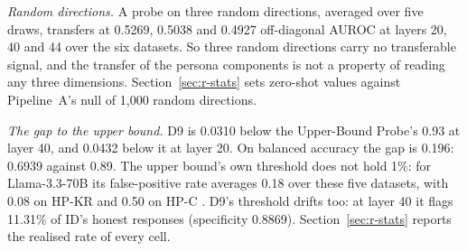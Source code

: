 \emph{Random directions.} A probe on three random directions, averaged over five draws, transfers at 0.5269, 0.5038 and 0.4927 off-diagonal AUROC at layers 20, 40 and 44 over the six datasets. %
So three random directions carry no transferable signal, and the transfer of the persona components is not a property of reading any three dimensions. %
Section~\ref{sec:r-stats} sets zero-shot values against Pipeline~A's null of 1{,}000 random directions. %

\emph{The gap to the upper bound.} D9 is 0.0310 below the Upper-Bound Probe's 0.93 at layer 40, and 0.0432 below it at layer 20. %
On balanced accuracy the gap is 0.196: 0.6939 against 0.89. %
The upper bound's own threshold does not hold 1\%: for Llama-3.3-70B its false-positive rate averages 0.18 over these five datasets, with 0.08 on HP-KR and 0.50 on HP-C \parencite[p.~56]{kretschmar2025liars}. %
D9's threshold drifts too: at layer 40 it flags 11.31\% of ID's honest responses (specificity 0.8869). %
Section~\ref{sec:r-stats} reports the realised rate of every cell.

